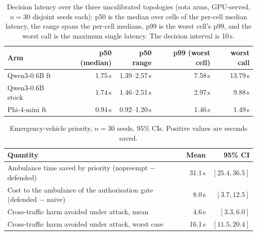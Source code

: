 \begin{table}[t]
\centering
\small
\begin{tabular}{lrrrr}
\toprule
Arm & p50 (median) & p50 range & p99 (worst cell) & worst call \\
\midrule
Qwen3-0.6B ft & 1.75\,s & 1.39--2.57\,s & 7.58\,s & 13.79\,s \\
Qwen3-0.6B stock & 1.74\,s & 1.46--2.51\,s & 2.97\,s & 9.88\,s \\
Phi-4-mini ft & 0.94\,s & 0.92--1.20\,s & 1.46\,s & 1.49\,s \\
\bottomrule
\end{tabular}
\caption{Decision latency over the three uncalibrated topologies (sota
arms, GPU-served, $n{=}30$ disjoint seeds each): p50 is the median over
cells of the per-cell median latency, the range spans the per-cell
medians, p99 is the worst cell's p99, and the worst call is the maximum
single latency. The decision interval is 10\,s.}
\label{tab:latency}
\end{table}

\begin{table}[t]
\centering
\small
\begin{tabular}{lrr}
\toprule
Quantity & Mean & 95\% CI \\
\midrule
Ambulance time saved by priority (nopreempt $-$ defended) & 31.1\,s & $[25.4, 36.5]$ \\
Cost to the ambulance of the authorisation gate (defended $-$ naive) & 8.0\,s & $[3.7, 12.5]$ \\
Cross-traffic harm avoided under attack, mean & 4.6\,s & $[3.3, 6.0]$ \\
Cross-traffic harm avoided under attack, worst case & 16.1\,s & $[11.5, 20.4]$ \\
\bottomrule
\end{tabular}
\caption{Emergency-vehicle priority, $n{=}30$ seeds, 95\% CIs. Positive
values are seconds saved.}
\label{tab:ev}
\end{table}
